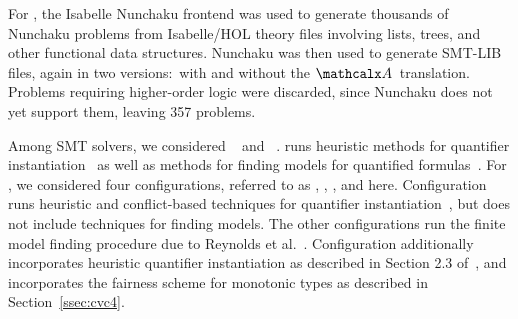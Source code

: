 For \isanun, the Isabelle Nunchaku frontend was used to generate thousands of
Nunchaku problems from Isabelle/HOL theory files involving lists, trees, and
other functional data structures. Nunchaku was then used to generate SMT-LIB
files, again in two versions:\ with and without the $\conv$~translation.
Problems requiring higher-order logic were discarded, since Nunchaku does not
yet support them, leaving 357 problems.





Among SMT solvers, we considered \ziii~\cite{de-moura-bjoerner-2008} and
\cvc~\cite{barrett-et-al-2011}.
\ziii runs heuristic methods for quantifier instantiation~\cite{MouraBjoerner07}
as well as methods for finding models for quantified formulas~\cite{GeDeM-CAV-09}.
For \cvc, we considered four configurations, referred
to as \cvcd, \cvcf, \cvcfe, and \cvcfm here.
Configuration \cvcd runs heuristic
and conflict-based techniques for quantifier instantiation~\cite{ReynoldsTinelliMoura14},
but does not include techniques for finding models.
The other configurations run the finite model
finding procedure due to Reynolds et al.\ \cite{ReyEtAl-1-RR-13,reynolds-et-al-2013}.
Configuration \cvcfe additionally incorporates heuristic quantifier instantiation as described in Section 2.3 of~\cite{reynolds-et-al-2013},
and \cvcfm incorporates the fairness scheme for monotonic types as described in Section~\ref{ssec:cvc4}.

